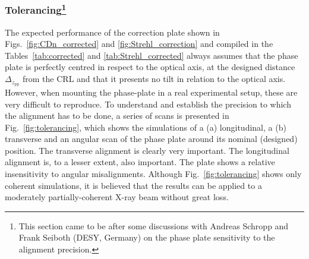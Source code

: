 \begin{refsection}
\subsubsection*{Tolerancing\footnote{This section came to be after some discussions with Andreas Schropp and Frank Seiboth (DESY, Germany) on the phase plate sensitivity to the alignment precision.}}

The expected performance of the correction plate shown in Figs.~\ref{fig:CDn_corrected} and \ref{fig:Strehl_correction} and compiled in the Tables~\ref{tab:corrected} and \ref{tab:Strehl_corrected} always assumes that the phase plate is perfectly centred in respect to the optical axis, at the designed distance $\Delta_{z_\text{pp}}$ from the CRL and that it presents no tilt in relation to the optical axis. However, when mounting the phase-plate in a real experimental setup, these are very difficult to reproduce. To understand and establish the precision to which the alignment has to be done, a series of scans is presented in Fig.~\ref{fig:tolerancing}, which shows the simulations of a (a) longitudinal, a (b) transverse and an angular scan of the phase plate around its nominal (designed) position. The transverse alignment is clearly very important. The longitudinal alignment is, to a lesser extent, also important. The plate shows a relative insensitivity to angular misalignments. Although Fig.~\ref{fig:tolerancing} shows only coherent simulations, it is believed that the results can be applied to a moderately partially-coherent X-ray beam without great loss.


\end{refsection}
